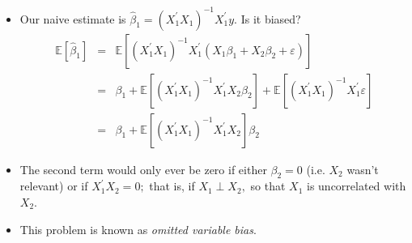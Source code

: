\documentclass[notes=show]{beamer}
\begin{document}
\begin{frame}%


\begin{itemize}
\item Our naive estimate is $\widehat{\beta }_{1}=(X_{1}^{\prime
}X_{1})^{-1}X_{1}^{\prime }y.$ Is it biased?%
\begin{eqnarray*}
\mathbb{E}[\widehat{\beta }_{1}] &=&\mathbb{E}[(X_{1}^{\prime
}X_{1})^{-1}X_{1}^{\prime }(X_{1}\beta _{1}+X_{2}\beta _{2}+\varepsilon )] \\
&=&\beta _{1}+\mathbb{E}[(X_{1}^{\prime }X_{1})^{-1}X_{1}^{\prime
}X_{2}\beta _{2}]+\mathbb{E}[(X_{1}^{\prime }X_{1})^{-1}X_{1}^{\prime
}\varepsilon ] \\
&=&\beta _{1}+\mathbb{E}[(X_{1}^{\prime }X_{1})^{-1}X_{1}^{\prime
}X_{2}]\beta _{2}
\end{eqnarray*}

\item The second term would only ever be zero if either $\beta _{2}=0$ (i.e. 
$X_{2}$ wasn't relevant) or if $X_{1}^{\prime }X_{2}=0;$ that is, if $%
X_{1}\perp X_{2},$ so that $X_{1}$ is uncorrelated with $X_{2}$.

\item This problem is known as \textit{omitted variable bias}.
\end{itemize}

\end{frame}%
\end{document}
